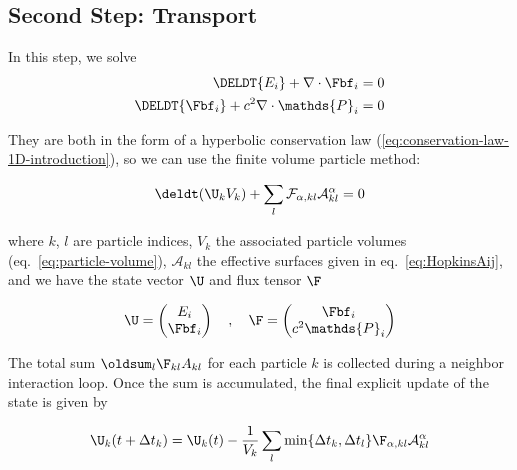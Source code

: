 \subsection{Second Step: Transport}\label{chap:transport-step}

In this step, we solve
\begin{align}
    \DELDT{E_i} + \nabla \cdot \Fbf_i &= 0 \label{eq:homogenized-dEdt}\\
    \DELDT{\Fbf_i} + c^2 \nabla \cdot \mathds{P}_i &= 0 \label{eq:homogenized-dFdt}
\end{align}

They are both in the form of a hyperbolic conservation law
(\ref{eq:conservation-law-1D-introduction}), so we can use the finite volume particle method:

\begin{align}
	\deldt(\U_k V_k) + \sum\limits_{l} \mathcal F_{\alpha, kl} \mathcal{A}^\alpha_{kl} = 0
\label{eq:rt-meshless}
\end{align}

where $k$, $l$ are particle indices, $V_k$ the associated particle volumes
(eq.~\ref{eq:particle-volume}), $\mathcal{A}_{kl}$ the effective surfaces given
in eq.~\ref{eq:HopkinsAij}, and we have the state vector $\U$ and flux tensor $\F$

\begin{align}
	\U =
		\begin{pmatrix}
			E_i \\
			\Fbf_i
		\end{pmatrix}
	\quad , \quad
	\F =
		\begin{pmatrix}
			\Fbf_i \\
			c^2 \mathds{P}_i
		\end{pmatrix}
\end{align}

The total sum $\oldsum_l \F_{kl} A_{kl}$ for each particle $k$ is collected during a neighbor
interaction loop. Once the sum is accumulated, the final explicit update of the state is given by

\begin{align}
\U_k(t + \Delta t_k) =
	\U_k (t) - \frac{1}{V_k} \sum\limits_{l} \min\{\Delta t_k, \Delta t_l\}
    \F_{\alpha,kl} \mathcal{A}_{kl}^\alpha
\label{eq:transport-update-explicit}
\end{align}

